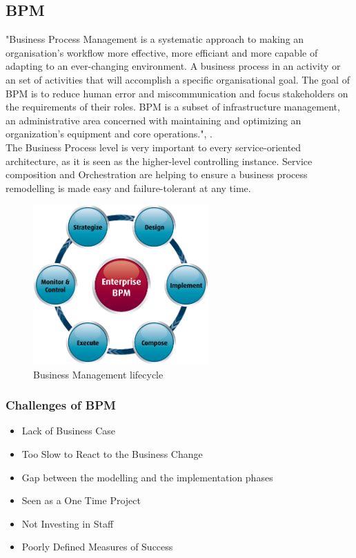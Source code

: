 \documentclass[12pt]{article}
\begin{document}
\subsection{BPM}
"Business Process Management is a systematic approach to making an organisation's workflow more effective, more efficiant and more capable of adapting to an ever-changing environment. A business process in an activity or an set of activities that will accomplish a specific organisational goal. The goal of BPM is to reduce human error and miscommunication and focus stakeholders on the requirements of their roles. BPM is a subset of infrastructure management, an administrative area concerned with maintaining and optimizing an organization's equipment and core operations.", \cite{bpmdef}. \\
The Business Process level is very important to every service-oriented architecture, as it is seen as the higher-level controlling instance. Service composition and Orchestration are helping to ensure a business process remodelling is made easy and failure-tolerant at any time. \cite[page 114]{te}
\begin{figure}[here!]
	\centering
	\includegraphics[width=0.6\textwidth]{images/bpm.png}
	\caption{Business Management lifecycle \cite{muede2}}
	\label{fig:anfang}
	\end{figure}
	\FloatBarrier
\subsubsection{Challenges of BPM \cite{bpmchall}}
\begin{itemize}
\item Lack of Business Case
\item Too Slow to React to the Business Change
\item Gap between the modelling and the implementation phases
\item Seen as a One Time Project 
\item Not Investing in Staff
\item Poorly Defined Measures of Success 
\end{itemize}
\end{document}

